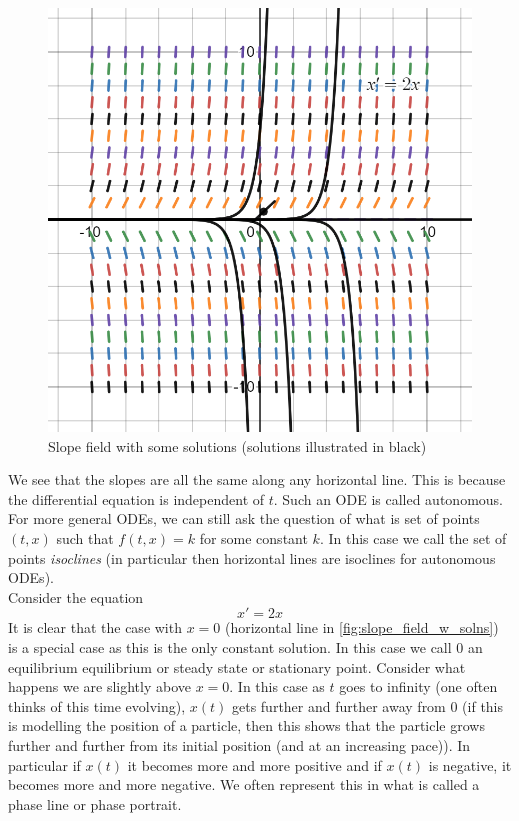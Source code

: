\begin{figure}
    \centering
    \includegraphics[scale=0.3]{Images/slope_field_with_solns.png}
    \caption{Slope field with some solutions (solutions illustrated in black)}
    \label{fig:slope_field_w_solns}
\end{figure}

We see that the slopes are all the same along any horizontal line. This is because the differential equation is independent of $t$. Such an ODE is called autonomous. For more general ODEs, we can still ask the question of what is set of points $(t, x)$ such that $f(t, x) = k$ for some constant $k$. In this case we call the set of points \textit{isoclines} (in particular then horizontal lines are isoclines for autonomous ODEs).\\

Consider the equation 
$$ x' = 2x $$
It is clear that the case with $x = 0$ (horizontal line in \autoref{fig:slope_field_w_solns}) is a special case as this is the only constant solution. In this case we call $0$ an equilibrium equilibrium or steady state or stationary point. Consider what happens we are slightly above $x = 0$. In this case as $t$ goes to infinity (one often thinks of this time evolving), $x(t)$ gets further and further away from 0 (if this is modelling the position of a particle, then this shows that the particle grows further and further from its initial position (and at an increasing pace)). In particular if $x(t)$ it becomes more and more positive and if $x(t)$ is negative, it becomes more and more negative. We often represent this in what is called a phase line or phase portrait.

